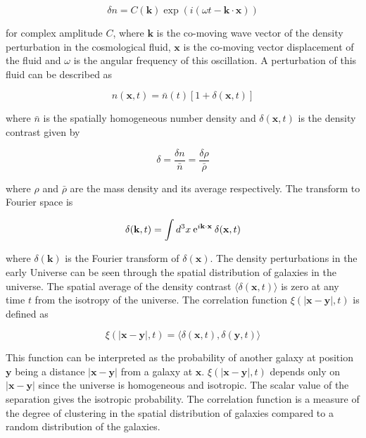 \documentclass[twocolumn]{article}
\numberwithin{equation}{section}
\begin{document}
\begin{equation}
    \delta n = C(\mathbf{k})\exp(i(\omega t - \mathbf{k}\cdot\mathbf{x}))
\end{equation}

for complex amplitude $C$, where $\mathbf{k}$ is the co-moving wave vector of the density perturbation in the 
cosmological fluid, $\mathbf{x}$ is the co-moving vector displacement of the fluid and $\omega$ is the angular frequency
of this oscillation. A perturbation of this fluid can be described as

\begin{equation}
    n(\mathbf{x},t) = \bar{n}(t)[1+\delta(\mathbf{x},t)]
\end{equation}

where $\bar{n}$ is the spatially homogeneous number density and $\delta(\mathbf{x},t)$ is the density contrast given by

\begin{equation}
    \delta = \frac{\delta n}{\bar{n}}=\frac{\delta \rho}{\bar{\rho}}
\end{equation}

where $\rho$ and $\bar{\rho}$ are the mass density and its average respectively. The transform to Fourier space is 

\begin{equation}
    \delta(\mathbf{k}, t) = \int d^3x \: \textup{e}^{i\mathbf{k}\cdot\mathbf{x}} \: \delta(\mathbf{x},t)
\end{equation}

where $\delta(\mathbf{k})$ is the Fourier transform of $\delta(\mathbf{x})$. The density perturbations in the early 
Universe can be seen through the spatial distribution of galaxies in the universe. The spatial average of the density 
contrast $\langle \delta(\mathbf{x},t) \rangle$ is zero at any time $t$ from the isotropy of the universe. The correlation
function $\xi(|\mathbf{x} - \mathbf{y}|,t)$ is defined as

\begin{equation}
    \xi(|\mathbf{x} - \mathbf{y}|,t) = \langle \delta(\mathbf{x}, t), \delta(\mathbf{y},t) \rangle
\end{equation}

This function can be interpreted as the probability of another galaxy at position $\mathbf{y}$ being a distance $|\mathbf{x}
- \mathbf{y}|$ from a galaxy at $\mathbf{x}$. $\xi(|\mathbf{x} - \mathbf{y}|,t)$ depends only on $|\mathbf{x} - \mathbf{y}|$
since the universe is homogeneous and isotropic. The scalar value of the separation gives the isotropic probability. The 
correlation function is a measure of the degree of clustering in the spatial distribution of galaxies compared to a random
distribution of the galaxies.
\end{document}

